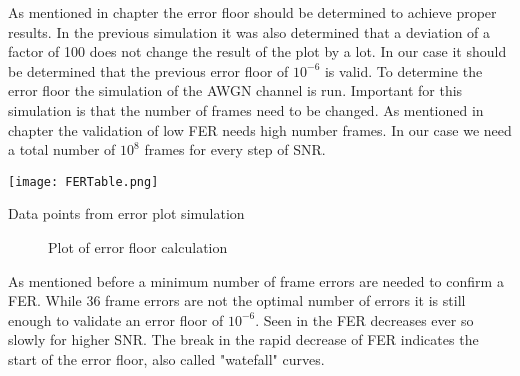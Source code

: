 As mentioned in chapter  the error floor should be determined to achieve proper results. In the previous simulation it was also determined that a deviation of a factor of 100 does not change the result of the plot by a lot. 
In our case it should be determined that the previous error floor of $10^{-6}$ is valid. 
\newline
To determine the error floor the simulation of the \gls{AWGN} channel is run. Important for this simulation is that the number of frames need to be changed. As mentioned in chapter  the validation of low \gls{FER} needs high number frames. In our case we need a total number of $10^{8}$ frames for every step of SNR.
\begin{table}[!htb]
	\centering
	\texttt{[image: FERTable.png]}
	\caption{Data points from error plot simulation}
	\label{fig:ErrorTable}
\end{table}
\begin{figure}[!htb]
	\setlength{}
	\setlength\fheight{0.4\textheight}
	\centering
	
	\caption{Plot of error floor calculation}
	\label{fig:ErrorFloor}
\end{figure}
As mentioned before a minimum number of frame errors are needed to confirm a \gls{FER}. While 36 frame errors are not the optimal number of errors it is still enough to validate an error floor of $10^{-6}$.
Seen in  the \gls{FER} decreases ever so slowly for higher \gls{SNR}. The break in the rapid decrease of \gls{FER} indicates the start of the error floor, also called "watefall" curves\cite{Richardson}. 
 






\clearpage

